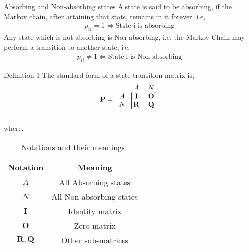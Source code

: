 \documentclass{beamer}
\renewcommand{\vec}[1]{\mathbf{#1}}
\let\vec\mathbf
\begin{document}
\begin{frame}
    \frametitle{}
    \begin{block}{Absorbing and Non-absorbing states}
        A state is said to be absorbing, if the Markov chain, after attaining that state, remains in it forever. i.e, 
\begin{align}
    p_{ii}=1\Leftrightarrow\text{State i is absorbing}
\end{align}
Any state which is not absorbing is Non-absorbing, i.e, the Markov Chain may perform a transition to another state, i.e,
\begin{align}
    p_{ii} \neq 1 \Leftrightarrow\text{State i is Non-absorbing}
\end{align}
    \end{block}
     \begin{block}{Definition 1}
         The standard form of a state transition matrix is,
         \begin{align}
   \vec{P}=\begin{blockarray}{ccc}
&A & N \\
\begin{block}{c[cc]}
  A & \vec{I} & \vec{O}  \\
  N & \vec{R} & \vec{Q} \\
\end{block}
\end{blockarray}
\label{eq3}
\end{align}
\end{block}
\end{frame}
\begin{frame}
\begin{block}{}
    where,
\begin{table}[h!]
\centering
\caption{Notations and their meanings}
\begin{tabular}{|c|c|}
    \hline
    Notation & Meaning \\
    \hline
    $A$ & All Absorbing states\\[1ex]
    \hline
    $N$ & All Non-absorbing states\\[1ex]
    \hline
    $\vec{I}$ & Identity matrix\\[1ex]
    \hline
    $\vec{O}$ & Zero matrix\\[1ex]
    \hline
    $\vec{R},\vec{Q}$ & Other sub-matrices\\[1ex]
    \hline
\end{tabular}
\end{table}
\end{block}
\end{frame}
\end{document}
